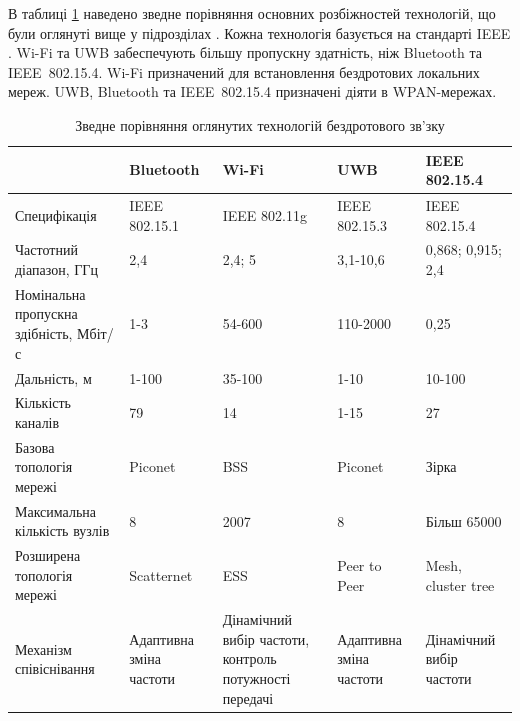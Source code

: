 \documentclass[a4paper,ukrainian,utf8,nocolumnsxix,floatsection]{eskdtext}
\newcommand{\iee}[0]{IEEE~802.15.4\xspace}
\begin{document}
В таблиці \ref{tbl:wireless_tech_comparison} наведено зведне порівняння основних розбіжностей технологій, що були оглянуті вище у підрозділах . Кожна технологія базується на стандарті IEEE . Wi-Fi та UWB забеспечують більшу пропускну здатність, ніж Bluetooth та \iee. Wi-Fi призначений для встановлення бездротових локальних мереж. UWB, Bluetooth та \iee призначені діяти в WPAN-мережах.


\begin{table}[htbp]
\caption{Зведне порівняння оглянутих технологій бездротового зв’зку}
\begin{tabular}{|p{}|p{}|p{}|p{}|p{}|}
\hline
                                       & Bluetooth               & Wi-Fi                                                  & UWB                     & IEEE 802.15.4            \\ \hline
Специфікація                           & IEEE 802.15.1 	         & IEEE 802.11g                                           & IEEE 802.15.3           & IEEE 802.15.4            \\ \hline
Частотний діапазон, ГГц                & 2,4                     & 2,4; 5                                                 & 3,1-10,6                & 0,868; 0,915; 2,4        \\ \hline
Номінальна пропускна здібність, Мбіт/с & 1-3                     & 54-600                                                 & 110-2000                & 0,25                     \\ \hline
Дальність, м                           & 1-100                   & 35-100                                                 & 1-10                    & 10-100                   \\ \hline
Кількість каналів                      & 79                      & 14                                                     & 1-15                    & 27                       \\ \hline
Базова топологія мережі                & Piconet                 & BSS                                                    & Piconet                 & Зірка                    \\ \hline
Максимальна кількість вузлів           & 8                       & 2007                                                   & 8                       & Більш 65000              \\ \hline
Розширена топологія мережі             & Scatternet              & ESS                                                    & Peer to Peer            & Mesh, cluster tree       \\ \hline
Механізм співіснівання                 & Адаптивна зміна частоти & Дінамічний вибір частоти, контроль потужності передачі & Адаптивна зміна частоти & Дінамічний вибір частоти \\ \hline

\end{tabular}

\label{tbl:wireless_tech_comparison}

\end{table}
\end{document}
